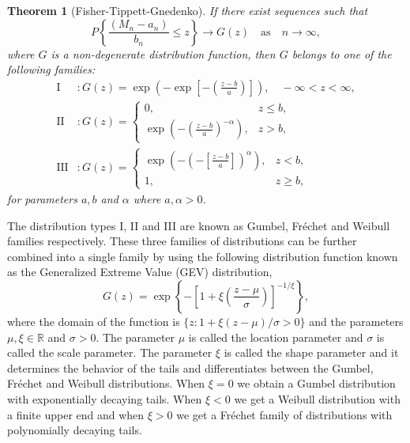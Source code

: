 \documentclass[11pt,a4paper,]{article}
\newtheorem{theorem}{Theorem}[section]
\theoremstyle{definition}
\theoremstyle{definition}
\theoremstyle{definition}
\theoremstyle{remark}
\begin{document}
\begin{theorem}[Fisher-Tippett-Gnedenko] \label{thm:FisherTippett}
    If there exist sequences such that
    $$
        P\left\{ \frac{(M_n - a_n)}{b_n} \leq z \right\} \rightarrow G(z) \quad \text{as} \quad n \to \infty,
    $$
    where $G$ is a non-degenerate distribution function, then $G$ belongs to one of the following families:
    \begin{align}\label{eq:EVT3}
        \text{I}   & : G(z) = \exp\left(-\exp \left[- \left(\frac{z-b}{a}\right) \right] \right), \quad -\infty < z < \infty , \\
        \text{II}  & : G(z) =
        \begin{cases}
            0 ,                                                           & z \leq b  , \\
            \exp \left( - \left( \frac{z-b}{a}\right)^{-\alpha} \right) , & z > b    ,
        \end{cases}                                                                                                \\
        \text{III} & : G(z) =
        \begin{cases}
            \exp \left( - \left(- \left[\frac{z-b}{a}\right]\right)^{\alpha} \right) , & z < b  ,    \\
            1 ,                                                                        & z \geq b  ,
        \end{cases}
    \end{align}
    for parameters $a, b$ and $\alpha$ where $a, \alpha >0$.
\end{theorem}

The distribution types I, II and III are known as Gumbel, Fréchet and Weibull families respectively. These three families of distributions can be further combined into a single family by using the following distribution function known as the Generalized Extreme Value (GEV) distribution,
\begin{equation}\label{eq:EVT4}
    G(z) = \exp\left\{ -\left[ 1 + \xi\left(\frac{z - \mu}{\sigma} \right)\right]^{-1/\xi} \right\} ,
\end{equation}
where the domain of the function is \(\{z: 1 + \xi (z - \mu)/\sigma >0 \}\) and the parameters \(\mu, \xi \in \mathbb{R}\) and \(\sigma > 0\). The parameter \(\mu\) is called the location parameter and \(\sigma\) is called the scale parameter. The parameter \(\xi\) is called the shape parameter and it determines the behavior of the tails and differentiates between the Gumbel, Fréchet and Weibull distributions. When \(\xi = 0\) we obtain a Gumbel distribution with exponentially decaying tails. When \(\xi < 0\) we get a Weibull distribution with a finite upper end and when \(\xi > 0\) we get a Fréchet family of distributions with polynomially decaying tails.
\end{document}
